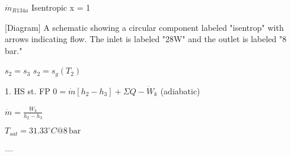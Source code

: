 \( \dot{m}_{R134a} \)  
Isentropic  
x = 1  

[Diagram]  
A schematic showing a circular component labeled "isentrop" with arrows indicating flow. The inlet is labeled "28W" and the outlet is labeled "8 bar."  

\( s_2 = s_3 \)  
\( s_2 = s_g(T_2) \)  

1. HS st. FP  
\( 0 = \dot{m}[h_2 - h_3] + \Sigma Q - \dot{W}_k \) (adiabatic)  

\( \dot{m} = \frac{\dot{W}_k}{h_2 - h_3} \)  

\( T_{sat} = 31.33^\circ C @ 8 \, \text{bar} \)  

---
